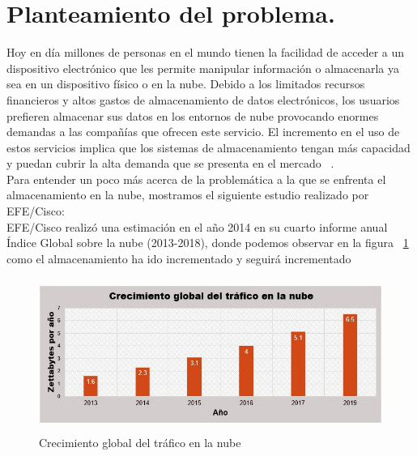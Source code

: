 \section{Planteamiento del problema.}
Hoy en día millones de personas en el mundo tienen la facilidad de acceder a un dispositivo electrónico que les permite manipular información o almacenarla ya sea en un dispositivo físico o en la nube.
Debido a los limitados recursos financieros y altos gastos de almacenamiento de datos electrónicos, los usuarios prefieren almacenar sus datos en los entornos de nube provocando enormes demandas a las compañías que ofrecen este servicio. El incremento en el uso de estos servicios implica que los sistemas de almacenamiento tengan más capacidad y puedan cubrir la alta demanda que se presenta en el mercado ~\cite{Keelveedhi}. \\


Para entender un poco más acerca de la problemática a la que se enfrenta el almacenamiento en la nube, mostramos el siguiente estudio realizado por EFE/Cisco: \\ 

EFE/Cisco realizó una estimación en el año 2014 en su cuarto informe anual Índice Global sobre la nube (2013-2018), donde podemos observar en la figura ~\ref{fig:1-2-1} como el almacenamiento ha ido incrementado y seguirá incrementado \\

\begin{figure}[H]
\centering
	\includegraphics[width=13cm, height=5cm]{./images/crecimientoNube.jpg}
	\caption{Crecimiento global del tráfico en la nube}
	\label{fig:1-2-1}
\end{figure}

